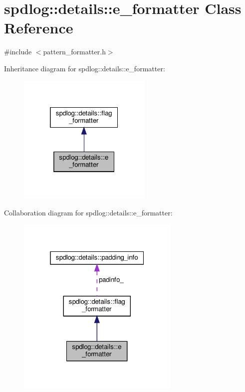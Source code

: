 \hypertarget{classspdlog_1_1details_1_1e__formatter}{}\section{spdlog\+:\+:details\+:\+:e\+\_\+formatter Class Reference}
\label{classspdlog_1_1details_1_1e__formatter}


{\ttfamily \#include $<$pattern\+\_\+formatter.\+h$>$}



Inheritance diagram for spdlog\+:\+:details\+:\+:e\+\_\+formatter\+:
\nopagebreak
\begin{figure}[H]
\begin{center}
\leavevmode
\includegraphics[width=181pt]{classspdlog_1_1details_1_1e__formatter__inherit__graph}
\end{center}
\end{figure}


Collaboration diagram for spdlog\+:\+:details\+:\+:e\+\_\+formatter\+:
\nopagebreak
\begin{figure}[H]
\begin{center}
\leavevmode
\includegraphics[width=220pt]{classspdlog_1_1details_1_1e__formatter__coll__graph}
\end{center}
\end{figure}
